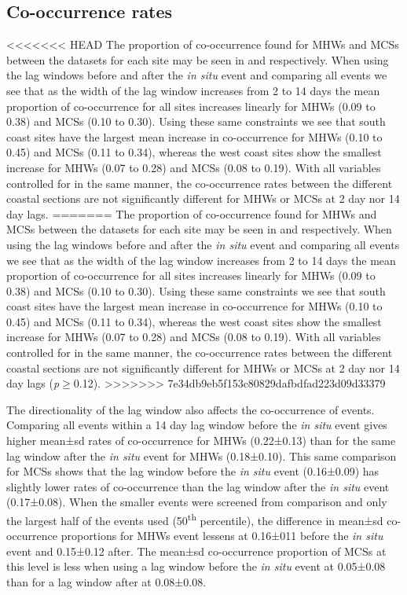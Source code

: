 \documentclass[a4paper,10pt,review]{elsarticle}
\begin{document}
\subsection{Co-occurrence rates}
<<<<<<< HEAD
The proportion of co-occurrence found for MHWs and MCSs between the datasets for each site may be seen in  and  respectively. When using the lag windows before and after the \emph{in situ} event and comparing all events we see that as the width of the lag window increases from 2 to 14 days the mean proportion of co-occurrence for all sites increases linearly for MHWs (0.09 to 0.38) and MCSs (0.10 to 0.30). Using these same constraints we see that south coast sites have the largest mean increase in co-occurrence for MHWs (0.10 to 0.45) and MCSs (0.11 to 0.34), whereas the west coast sites show the smallest increase for MHWs (0.07 to 0.28) and MCSs (0.08 to 0.19). With all variables controlled for in the same manner, the co-occurrence rates between the different coastal sections are not significantly different for MHWs or MCSs at 2 day nor 14 day lags. 
=======
The proportion of co-occurrence found for MHWs and MCSs between the datasets for each site may be seen in  and  respectively. When using the lag windows before and after the \emph{in situ} event and comparing all events we see that as the width of the lag window increases from 2 to 14 days the mean proportion of co-occurrence for all sites increases linearly for MHWs (0.09 to 0.38) and MCSs (0.10 to 0.30). Using these same constraints we see that south coast sites have the largest mean increase in co-occurrence for MHWs (0.10 to 0.45) and MCSs (0.11 to 0.34), whereas the west coast sites show the smallest increase for MHWs (0.07 to 0.28) and MCSs (0.08 to 0.19). With all variables controlled for in the same manner, the co-occurrence rates between the different coastal sections are not significantly different for MHWs or MCSs at 2 day nor 14 day lags (\emph{p}$\geq$0.12).
>>>>>>> 7e34db9eb5f153c80829dafbdfad223d09d33379

The directionality of the lag window also affects the co-occurrence of events. Comparing all events within a 14 day lag window before the \emph{in situ} event gives higher mean±sd rates of co-occurrence for MHWs (0.22±0.13) than for the same lag window after the \emph{in situ} event for MHWs (0.18±0.10). This same comparison for MCSs shows that the lag window before the \emph{in situ} event (0.16±0.09) has slightly lower rates of co-occurrence than the lag window after the \emph{in situ} event (0.17±0.08). When the smaller events were screened from comparison and only the largest half of the events used (50\textsuperscript{th} percentile), the difference in mean±sd co-occurrence proportions for MHWs event lessens at 0.16±011 before the \emph{in situ} event and 0.15±0.12 after. The mean±sd co-occurrence proportion of MCSs at this level is less when using a lag window before the \emph{in situ} event at 0.05±0.08 than for a lag window after at 0.08±0.08.
\end{document}
